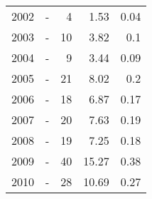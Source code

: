 \begin{longtable}{lXrrr}
        2002 & \multicolumn{1}{X}{-} & %
          \num{4} &
          \num[round-mode=places,round-precision=2]{1.53} &
          \num[round-mode=places,round-precision=2]{0.04} \\

        2003 & \multicolumn{1}{X}{-} & %
          \num{10} &
          \num[round-mode=places,round-precision=2]{3.82} &
          \num[round-mode=places,round-precision=2]{0.1} \\

        2004 & \multicolumn{1}{X}{-} & %
          \num{9} &
          \num[round-mode=places,round-precision=2]{3.44} &
          \num[round-mode=places,round-precision=2]{0.09} \\

        2005 & \multicolumn{1}{X}{-} & %
          \num{21} &
          \num[round-mode=places,round-precision=2]{8.02} &
          \num[round-mode=places,round-precision=2]{0.2} \\

        2006 & \multicolumn{1}{X}{-} & %
          \num{18} &
          \num[round-mode=places,round-precision=2]{6.87} &
          \num[round-mode=places,round-precision=2]{0.17} \\

        2007 & \multicolumn{1}{X}{-} & %
          \num{20} &
          \num[round-mode=places,round-precision=2]{7.63} &
          \num[round-mode=places,round-precision=2]{0.19} \\

        2008 & \multicolumn{1}{X}{-} & %
          \num{19} &
          \num[round-mode=places,round-precision=2]{7.25} &
          \num[round-mode=places,round-precision=2]{0.18} \\

        2009 & \multicolumn{1}{X}{-} & %
          \num{40} &
          \num[round-mode=places,round-precision=2]{15.27} &
          \num[round-mode=places,round-precision=2]{0.38} \\

        2010 & \multicolumn{1}{X}{-} & %
          \num{28} &
          \num[round-mode=places,round-precision=2]{10.69} &
          \num[round-mode=places,round-precision=2]{0.27} \\


\end{longtable}
